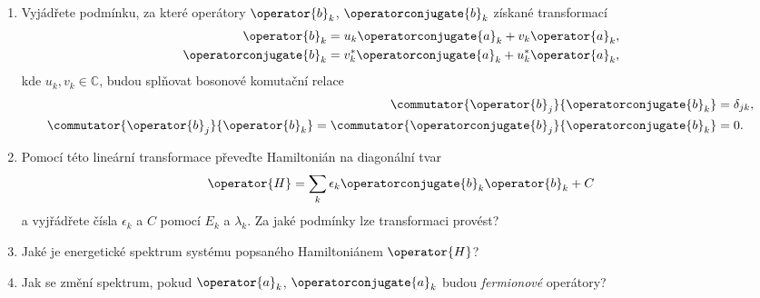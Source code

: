 \begin{enumerate}
    \item 
        Vyjádřete podmínku, za které operátory $\operator{b}_{k}$, $\operatorconjugate{b}_{k}$ získané transformací
        \begin{subequations}
            \begin{align}
                \operator{b}_{k}=u_{k}\operatorconjugate{a}_{k}+v_{k}\operator{a}_{k},\\
                \operatorconjugate{b}_{k}=v_{k}^{*}\operatorconjugate{a}_{k}+u_{k}^{*}\operator{a}_{k},
            \end{align}                
        \end{subequations}
        kde $u_{k},v_{k}\in\mathbb{C}$, budou splňovat bosonové komutační relace
        \begin{subequations}
            \begin{align}
                \commutator{\operator{b}_{j}}{\operatorconjugate{b}_{k}}&=\delta_{jk},\\
                \commutator{\operator{b}_{j}}{\operator{b}_{k}}=\commutator{\operatorconjugate{b}_{j}}{\operatorconjugate{b}_{k}}&=0.
            \end{align}                
        \end{subequations}

    \item
        Pomocí této lineární transformace převeďte Hamiltonián na diagonální tvar
        \begin{equation}
            \operator{H}=\sum_{k}\epsilon_{k}\operatorconjugate{b}_{k}\operator{b}_{k}+C
        \end{equation}
        a vyjřádřete čísla $\epsilon_{k}$ a $C$ pomocí $E_{k}$ a $\lambda_{k}$.
        Za jaké podmínky lze transformaci provést?
    
    \item
        Jaké je energetické spektrum systému popsaného Hamiltoniánem $\operator{H}$?

    \item
        Jak se změní spektrum, pokud $\operator{a}_{k}$, $\operatorconjugate{a}_{k}$ budou \emph{fermionové} operátory?
\end{enumerate}